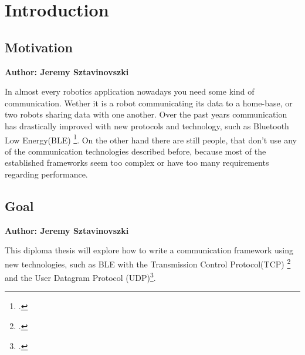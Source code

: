 \chapter{Introduction}

\makeatletter
\renewcommand\paragraph{\@startsection{paragraph}{4}{\z@}%
                                     {-3.25ex\@plus -1ex \@minus -.2ex}%
                                     {1.5ex \@plus .2ex}%
                                     {\normalfont\normalsize\bfseries}}
 \setcounter{secnumdepth}{4}
\makeatother

\vspace{2mm}

\section{Motivation}
\textbf{Author: Jeremy Sztavinovszki}

In almost every robotics application nowadays you need some kind of communication. Wether it is a robot communicating
its data to a home-base, or two robots sharing data with one another. Over the past years communication has drastically
improved with new protocols and technology, such as Bluetooth Low Energy(BLE) \footcite{bluetooth-low-energy}. On the other hand there are still people, that
don't use any of the communication technologies described before, because most of the established frameworks seem too
complex or have too many requirements regarding performance. 

\section{Goal}
\textbf{Author: Jeremy Sztavinovszki}

This diploma thesis will explore how to write a communication framework using new technologies, such as BLE with the Transmission Control Protocol(TCP) \footcite{rfc9293}
and the User Datagram Protocol (UDP)\footcite{rfc768}.

